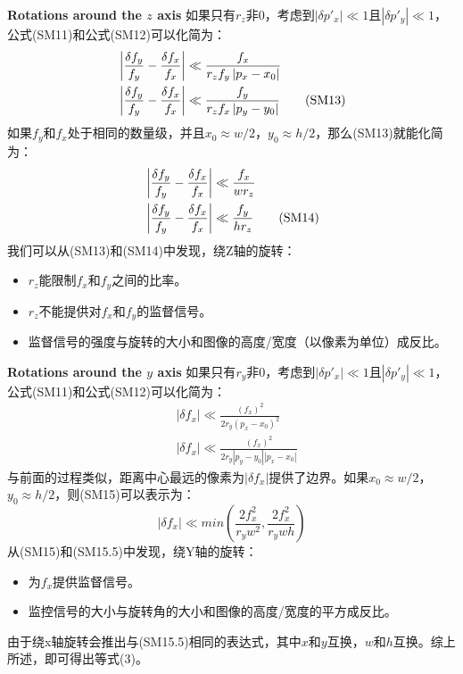 \documentclass[10pt,journal,compsoc,UTF8]{IEEEtran}
\begin{document}
\textbf{Rotations around the $z$ axis}
如果只有$r_z$非0，考虑到$|\delta p'_x|\ll 1$且$|\delta p'_y|\ll 1$，公式(SM11)和公式(SM12)可以化简为：
\begin{align*}
  \centering
  &\left|\frac{\delta f_y}{f_y}-\frac{\delta f_x}{f_x} \right|\ll \frac{f_x}{r_zf_y\left|p_x-x_0\right|}\\
  &\left|\frac{\delta f_y}{f_y}-\frac{\delta f_x}{f_x} \right|\ll \frac{f_y}{r_zf_x\left|p_y-y_0\right|}
  \tag{SM13}
\end{align*}
如果$f_y$和$f_x$处于相同的数量级，并且$x_0\approx w/2$，$y_0\approx h/2$，那么(SM13)就能化简为：
\begin{align*}
  \centering
  &\left|\frac{\delta f_y}{f_y}-\frac{\delta f_x}{f_x} \right|\ll \frac{f_x}{wr_z}\\
  &\left|\frac{\delta f_y}{f_y}-\frac{\delta f_x}{f_x} \right|\ll \frac{f_y}{hr_z}
  \tag{SM14}
\end{align*}
我们可以从(SM13)和(SM14)中发现，绕Z轴的旋转：
\begin{itemize}
  \item $r_z$能限制$f_x$和$f_y$之间的比率。
  \item $r_z$不能提供对$f_x$和$f_y$的监督信号。
  \item 监督信号的强度与旋转的大小和图像的高度/宽度（以像素为单位）成反比。
\end{itemize}

\textbf{Rotations around the $y$ axis}
如果只有$r_y$非0，考虑到$|\delta p'_x|\ll 1$且$|\delta p'_y|\ll 1$，公式(SM11)和公式(SM12)可以化简为：
\begin{align*}
  &|\delta f_x| \ll \frac{(f_x)^2}{2r_y(p_x-x_0)^2}\\
  &|\delta f_x| \ll \frac{(f_x)^2}{2r_y|p_y-y_0||p_x-x_0|}
  \tag{SM15}
\end{align*}
与前面的过程类似，距离中心最远的像素为$|\delta f_x|$提供了边界。如果$x_0\approx w/2$，$y_0\approx h/2$，则(SM15)可以表示为：
\begin{equation*}
  |\delta f_x|\ll min\left(\frac{2f_x^2}{r_yw^2},\frac{2f_x^2}{r_ywh}\right)
  \tag{SM15.5}
\end{equation*}
从(SM15)和(SM15.5)中发现，绕Y轴的旋转：
\begin{itemize}
  \item 为$f_x$提供监督信号。
  \item 监控信号的大小与旋转角的大小和图像的高度/宽度的平方成反比。
\end{itemize}

由于绕x轴旋转会推出与(SM15.5)相同的表达式，其中$x$和$y$互换，$w$和$h$互换。综上所述，即可得出等式(3)。
\end{document}
